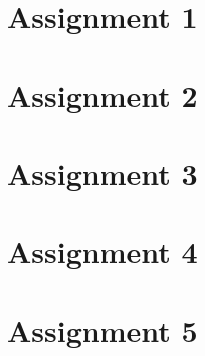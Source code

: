 \documentclass[../main.tex]{subfiles}
\begin{document}
\section{Assignment 1}%
\label{sec:assignment_1}

\newpage
\section{Assignment 2}%
\label{sec:assignment_2}

\newpage
\section{Assignment 3}%
\label{sec:assignment_3}

\newpage
\section{Assignment 4}%
\label{sec:assignment_4}

\newpage
\section{Assignment 5}%
\label{sec:assignment_5}


	
\end{document}
